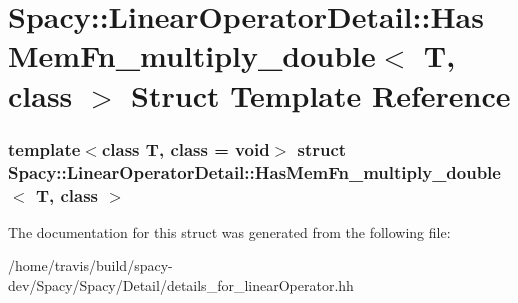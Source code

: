 \hypertarget{structSpacy_1_1LinearOperatorDetail_1_1HasMemFn__multiply__double}{\section{\-Spacy\-:\-:\-Linear\-Operator\-Detail\-:\-:\-Has\-Mem\-Fn\-\_\-multiply\-\_\-double$<$ \-T, class $>$ \-Struct \-Template \-Reference}
\label{structSpacy_1_1LinearOperatorDetail_1_1HasMemFn__multiply__double}
}
\subsubsection*{template$<$class T, class = void$>$ struct Spacy\-::\-Linear\-Operator\-Detail\-::\-Has\-Mem\-Fn\-\_\-multiply\-\_\-double$<$ T, class $>$}



\-The documentation for this struct was generated from the following file\-:\begin{DoxyCompactItemize}
\item 
/home/travis/build/spacy-\/dev/\-Spacy/\-Spacy/\-Detail/details\-\_\-for\-\_\-linear\-Operator.\-hh\end{DoxyCompactItemize}
